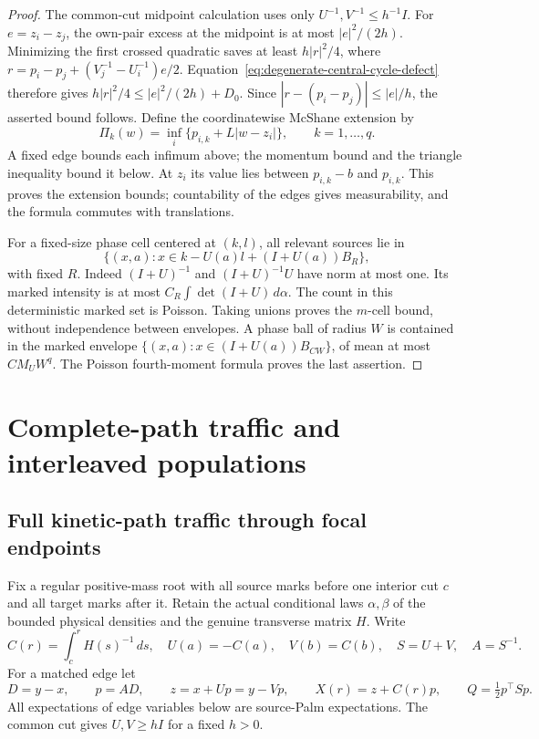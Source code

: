 \documentclass[11pt,reqno]{amsart}
\theoremstyle{definition}
\theoremstyle{remark}
\numberwithin{equation}{section}
\begin{document}
\begin{proof}
The common-cut midpoint calculation uses only $U^{-1},V^{-1}\le h^{-1}I$.
For $e=z_i-z_j$, the own-pair excess at the midpoint is at most
$|e|^2/(2h)$. Minimizing the first crossed quadratic saves at least
$h|r|^2/4$, where
$r=p_i-p_j+(V_j^{-1}-U_i^{-1})e/2$.
Equation~\eqref{eq:degenerate-central-cycle-defect} therefore gives
$h|r|^2/4\le |e|^2/(2h)+D_0$. Since
$|r-(p_i-p_j)|\le|e|/h$, the asserted bound follows.
Define the coordinatewise McShane extension by
\[
 \Pi_k(w)=\inf_i\{p_{i,k}+L|w-z_i|\},\qquad k=1,\ldots,q.
\]
A fixed edge bounds each infimum above; the momentum bound and the
triangle inequality bound it below. At $z_i$ its value lies between
$p_{i,k}-b$ and $p_{i,k}$. This proves the extension bounds; countability
of the edges gives measurability, and the formula commutes with translations.

For a fixed-size phase cell centered at $(k,l)$, all relevant sources lie in
\[
 \{(x,a):x\in k-U(a)l+(I+U(a))B_R\},
\]
with fixed $R$. Indeed $(I+U)^{-1}$ and $(I+U)^{-1}U$ have norm at most
one. Its marked intensity is at most $C_R\int\det(I+U)\,d\alpha$.
The count in this deterministic marked set is Poisson. Taking unions
proves the $m$-cell bound, without independence between envelopes.
A phase ball of radius $W$ is contained in the marked envelope
$\{(x,a):x\in(I+U(a))B_{CW}\}$, of mean at most $CM_UW^q$.
The Poisson fourth-moment formula proves the last assertion.
\end{proof}
\section{Complete-path traffic and interleaved populations}\label{sec:complete-path-traffic}

\subsection{Full kinetic-path traffic through focal endpoints}
\label{subsec:focal-traffic}

Fix a regular positive-mass root with all source marks before one
interior cut $c$ and all target marks after it. Retain the actual
conditional laws $\alpha,\beta$ of the bounded physical densities and
the genuine transverse matrix $H$. Write
\[
 C(r)=\int_c^r H(s)^{-1}\,ds,\quad U(a)=-C(a),\quad V(b)=C(b),
 \quad S=U+V,\quad A=S^{-1}.
\]
For a matched edge let
\[
 D=y-x,\qquad p=AD,\qquad z=x+Up=y-Vp,\qquad
 X(r)=z+C(r)p,\qquad Q=\tfrac12p^\top Sp.
\]
All expectations of edge variables below are source-Palm expectations.
The common cut gives $U,V\ge hI$ for a fixed $h>0$.
\end{document}
